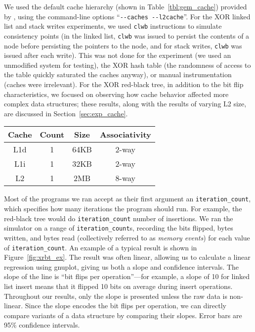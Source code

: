 We used the default cache hierarchy (shown in Table~\ref{tbl:gem_cache}) provided by \gem, using the
command-line options ``\texttt{-{}-caches -{}-l2cache}''.  For the XOR linked list and stack writes
experiments, we used \texttt{clwb} instructions to simulate consistency points (in the linked list,
\texttt{clwb} was issued to persist the contents of a node before persisting the pointers to the
node, and for stack writes, \texttt{clwb} was issued after each write). This was not done
for the \malloc experiment (we used an unmodified system \malloc for testing), the XOR hash table
(the randomness of access to the table quickly saturated the caches anyway), or manual
instrumentation (caches were irrelevant). For the XOR red-black tree, in addition to the bit flip
characteristics, we focused on observing how cache behavior affected more complex data structures;
these results, along with the results of varying L2 size, are discussed in
Section~\ref{sec:exp_cache}.



\begin{SCtable}
	\centering
	\caption{Cache parameters used in \gem.}
	\label{tbl:gem_cache}
	\begin{tabular}{c | c | c | c}
		\textbf{Cache} & \textbf{Count} & \textbf{Size} & \textbf{Associativity}
		\\
		\hline
		L1d            & 1              & 64KB          & 2-way                  \\
		L1i            & 1              & 32KB          & 2-way                  \\
		L2             & 1              & 2MB           & 8-way                  \\
	\end{tabular}
\end{SCtable}

Most of the programs we ran accept as their first argument an
\texttt{iteration\_count}, which specifies how many iterations the program should run. For
example, the red-black tree would do \texttt{iteration\_count}
number of insertions. We ran the simulator on a range of
\texttt{iteration\_count}s,
recording the bits flipped, bytes written, and bytes read (collectively referred
to as \textit{memory events}) for each value of \texttt{iteration\_count}.
An example of a typical
result is shown in Figure~\ref{fig:xrbt_ex}. The result was often linear,
allowing us to calculate a linear regression using gnuplot,
giving us both a slope and confidence intervals. The slope of the line is ``bit
flips per operation''---for example, a slope of 10 for linked list insert means
that it flipped 10 bits on average during insert operations.
Throughout our results, only the slope is presented unless the raw data is
non-linear. Since the slope encodes the bit flips per operation, we can directly
compare variants of a data structure by comparing their slopes. Error bars are
95\% confidence intervals.

